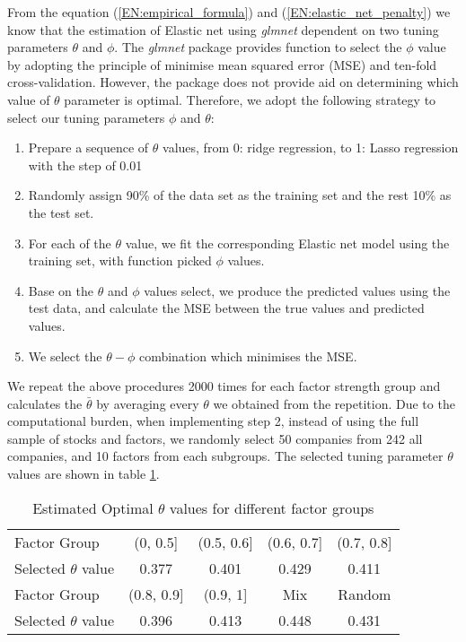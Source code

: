 From the equation (\ref{EN:empirical_formula}) and (\ref{EN:elastic_net_penalty}) we know that the estimation of Elastic net using \textit{glmnet} dependent on two tuning parameters $\theta$ and $\phi$.
The \textit{glmnet} package provides function to select the $\phi$ value by adopting the principle of minimise mean squared error (MSE) and ten-fold cross-validation.
However, the package does not provide aid on determining which value of $\theta$ parameter is optimal.
Therefore, we adopt the following strategy to select our tuning parameters $\phi$  and $\theta$:
\begin{enumerate}
\item Prepare a sequence of $\theta$ values, from 0: ridge regression, to 1: Lasso regression with the step of 0.01
\item Randomly assign 90\% of the data set as the training set and the rest 10\% as the test set. 
\item For each of the $\theta$ value, we fit the corresponding Elastic net model using the training set, with function picked $\phi$ values.
\item Base on the $\theta$ and $\phi$ values select, we produce the predicted values using the test data, and calculate the MSE between the true values and predicted values.
\item We select the $\theta - \phi$ combination which minimises the MSE.
\end{enumerate}
We repeat the above procedures 2000 times for each factor strength group and
calculates the $\bar{\theta}$ by averaging every $\theta$ we obtained from the repetition.
Due to the computational burden, when implementing step 2, instead of using the full sample of stocks and factors, we randomly select 50 companies from 242 all companies, and 10 factors from each subgroups.
The selected tuning parameter $\theta$ values are shown in table \ref{table:optimal_theta}.
\begin{table}[H]
	\centering
	\caption{Estimated Optimal $\theta$ values for different factor groups}
	\label{table:optimal_theta}
	\begin{tabular}{l|cccc}
		\hline
		\hline
		Factor Group            & (0, 0.5{]}   & (0.5, 0.6{]} & (0.6, 0.7{]} & (0.7, 0.8{]} \\ 
		Selected $\theta$ value & 0.377        & 0.401        & 0.429        & 0.411        \\ \hline
		Factor Group            & (0.8, 0.9{]} & (0.9, 1{]}   & Mix          & Random       \\ 
		Selected $\theta$ value & 0.396        & 0.413        & 0.448        & 0.431        \\ \hline
		\hline
	\end{tabular}
\end{table}
